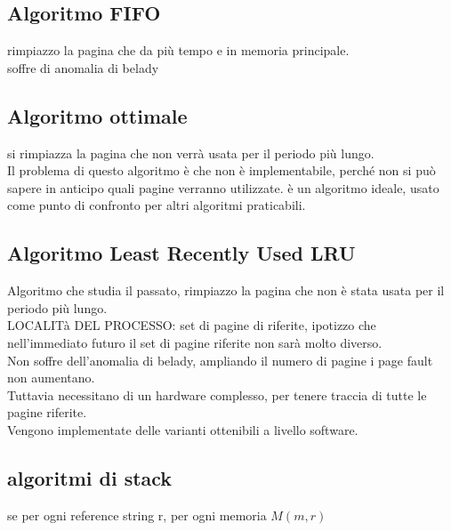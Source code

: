 \documentclass{article}
\begin{document}
\subsection{Algoritmo FIFO}
rimpiazzo la pagina che da più tempo e in memoria principale.\\
soffre di anomalia di belady \\
\subsection{Algoritmo ottimale}
si rimpiazza la pagina che non verrà usata per il periodo più lungo.\\
Il problema di questo algoritmo è che non è implementabile, perché non si può sapere in anticipo quali pagine verranno utilizzate. 
è un algoritmo ideale, usato come punto di confronto per altri algoritmi praticabili.\\
\subsection{Algoritmo Least Recently Used LRU}
Algoritmo che studia il passato, rimpiazzo la pagina che non è stata usata per il periodo più lungo.\\
LOCALITà DEL PROCESSO: set di pagine di riferite, ipotizzo che nell'immediato futuro il set di pagine riferite non sarà molto diverso.\\
Non soffre dell'anomalia di belady, ampliando il numero di pagine i page fault non aumentano.\\
Tuttavia necessitano di un hardware complesso, per tenere traccia di tutte le pagine riferite.\\
Vengono implementate delle varianti ottenibili a livello software.
\subsection{algoritmi di stack}
se per ogni reference string r, per ogni memoria $M(m,r)$
\end{document}
